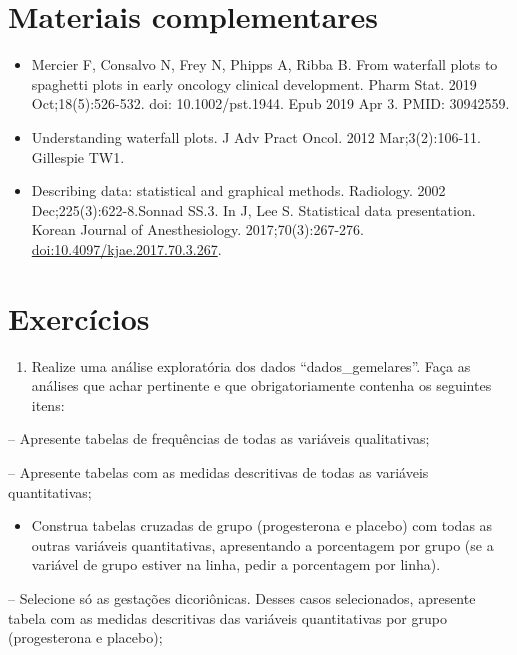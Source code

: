 \documentclass[
]{book}
\providecommand{\tightlist}{%
  \setlength{\itemsep}{0pt}\setlength{\parskip}{0pt}}
\begin{document}
\hypertarget{materiais-complementares}{%
\section{Materiais complementares}\label{materiais-complementares}}

\begin{itemize}
\item
  Mercier F, Consalvo N, Frey N, Phipps A, Ribba B. From waterfall plots to spaghetti plots in early oncology clinical development. Pharm Stat. 2019 Oct;18(5):526-532. doi: 10.1002/pst.1944. Epub 2019 Apr 3. PMID: 30942559.
\item
  Understanding waterfall plots. J Adv Pract Oncol. 2012 Mar;3(2):106-11. Gillespie TW1.
\item
  Describing data: statistical and graphical methods. Radiology. 2002 Dec;225(3):622-8.Sonnad SS.3. In J, Lee S. Statistical data presentation. Korean Journal of Anesthesiology. 2017;70(3):267-276. \url{doi:10.4097/kjae.2017.70.3.267}.
\end{itemize}

\hypertarget{exercuxedcios}{%
\section{Exercícios}\label{exercuxedcios}}

\begin{enumerate}
\def\labelenumi{\arabic{enumi}.}
\tightlist
\item
  Realize uma análise exploratória dos dados ``dados\_gemelares''. Faça as análises que achar pertinente e que obrigatoriamente contenha os seguintes itens:
\end{enumerate}

-- Apresente tabelas de frequências de todas as variáveis qualitativas;

-- Apresente tabelas com as medidas descritivas de todas as variáveis quantitativas;

\begin{itemize}
\tightlist
\item
  Construa tabelas cruzadas de grupo (progesterona e placebo) com todas as outras variáveis quantitativas, apresentando a porcentagem por grupo (se a variável de grupo estiver na linha, pedir a porcentagem por linha).
\end{itemize}

-- Selecione só as gestações dicoriônicas. Desses casos selecionados, apresente tabela com as medidas descritivas das variáveis quantitativas por grupo (progesterona e placebo);
\end{document}
